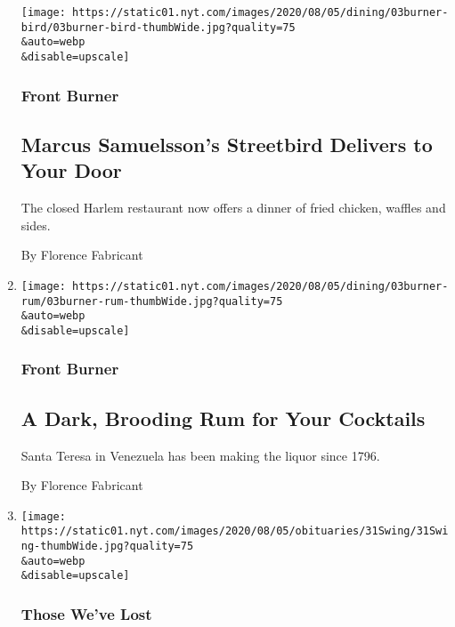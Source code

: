\begin{enumerate}
  \texttt{[image: https://static01.nyt.com/images/2020/08/05/dining/03burner-bird/03burner-bird-thumbWide.jpg?quality=75\\\&auto=webp\\\&disable=upscale]}

  \hypertarget{front-burner-4}{%
  \subsubsection{Front Burner}\label{front-burner-4}}

  \hypertarget{marcus-samuelssons-streetbird-delivers-to-your-door}{%
  \subsection{Marcus Samuelsson's Streetbird Delivers to Your
  Door}\label{marcus-samuelssons-streetbird-delivers-to-your-door}}

  The closed Harlem restaurant now offers a dinner of fried chicken,
  waffles and sides.

  By Florence Fabricant
\item
  \href{/2020/08/03/dining/drinks/santa-teresa-rum.html}{}

  \texttt{[image: https://static01.nyt.com/images/2020/08/05/dining/03burner-rum/03burner-rum-thumbWide.jpg?quality=75\\\&auto=webp\\\&disable=upscale]}

  \hypertarget{front-burner-5}{%
  \subsubsection{Front Burner}\label{front-burner-5}}

  \hypertarget{a-dark-brooding-rum-for-your-cocktails}{%
  \subsection{A Dark, Brooding Rum for Your
  Cocktails}\label{a-dark-brooding-rum-for-your-cocktails}}

  Santa Teresa in Venezuela has been making the liquor since 1796.

  By Florence Fabricant
\item
  \href{/2020/08/03/obituaries/john-swing-dead-coronavirus.html}{}

  \texttt{[image: https://static01.nyt.com/images/2020/08/05/obituaries/31Swing/31Swing-thumbWide.jpg?quality=75\\\&auto=webp\\\&disable=upscale]}

  \hypertarget{those-weve-lost}{%
  \subsubsection{Those We've Lost}\label{those-weve-lost}}


\end{enumerate}
